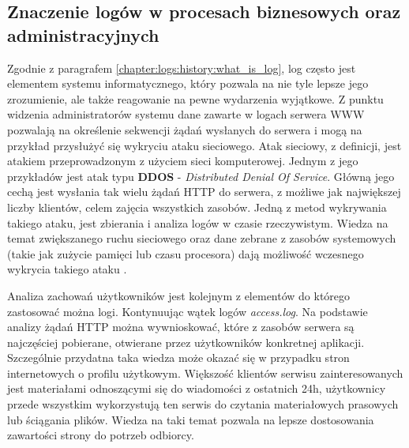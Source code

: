     \subsection{Znaczenie logów w procesach biznesowych oraz administracyjnych}
    Zgodnie z paragrafem \ref{chapter:logs:history:what_is_log}, log często jest elementem systemu informatycznego, 
    który pozwala na nie tyle lepsze jego zrozumienie, ale także reagowanie na pewne wydarzenia wyjątkowe.
    Z punktu widzenia administratorów systemu dane zawarte w logach serwera WWW pozwalają na określenie 
    sekwencji żądań wysłanych do serwera i mogą na przykład przysłużyć się wykryciu ataku sieciowego.
    Atak sieciowy, z definicji, jest atakiem przeprowadzonym z użyciem sieci komputerowej.
    Jednym z jego przykładów jest atak typu \textbf{DDOS} - \textit{Distributed Denial Of Service}. 
    Główną jego cechą jest wysłania tak wielu żądań HTTP do serwera, z możliwe jak największej liczby klientów,
    celem zajęcia wszystkich zasobów. Jedną z metod wykrywania takiego ataku, jest zbierania i analiza logów
    w czasie rzeczywistym. Wiedza na temat zwiększanego ruchu sieciowego oraz dane zebrane z zasobów systemowych (takie jak zużycie pamięci lub czasu procesora)
    dają możliwość wczesnego wykrycia takiego ataku \cite{web_based_attacks}.
    
    Analiza zachowań użytkowników jest kolejnym z elementów do którego zastosować można logi.
    Kontynuując wątek logów \textit{access.log}. Na podstawie analizy żądań HTTP można wywnioskować, które z zasobów 
    serwera są najczęściej pobierane, otwierane przez użytkowników konkretnej aplikacji. Szczególnie
    przydatna taka wiedza może okazać się w przypadku stron internetowych o profilu użytkowym.
    Większość klientów serwisu zainteresowanych jest materiałami odnoszącymi się do wiadomości z ostatnich 24h,
    użytkownicy przede wszystkim wykorzystują ten serwis do czytania materiałowych prasowych lub ściągania plików.
    Wiedza na taki temat pozwala na lepsze dostosowania zawartości strony do potrzeb odbiorcy.
    